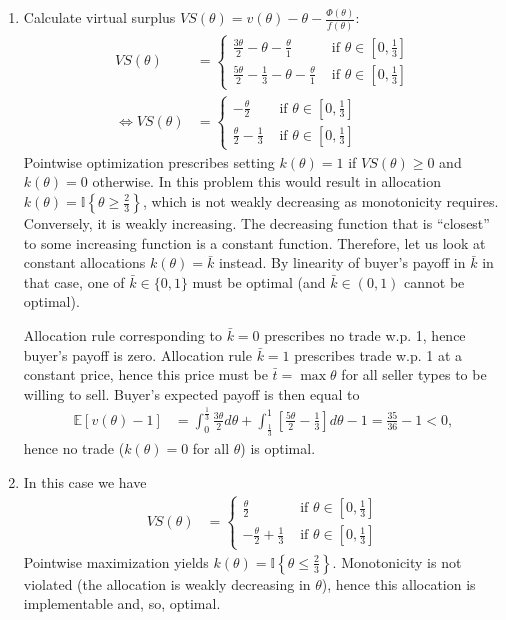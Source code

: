 \documentclass[a4paper]{article}
\begin{document}
\begin{enumerate}
	
	\item 
	Calculate virtual surplus $VS(\theta) = v(\theta) - \theta - \frac{\Phi(\theta)}{f(\theta)}$: 
	\begin{align*}
		VS(\theta) &= 
		\begin{cases}
			\frac{3\theta}{2} - \theta - \frac{\theta}{1} &\text{ if } \theta \in [0, \frac{1}{3}]
			\\
			\frac{5\theta}{2} - \frac{1}{3} - \theta - \frac{\theta}{1} &\text{ if } \theta \in [0, \frac{1}{3}]
		\end{cases}
		\\
		\Leftrightarrow
		VS(\theta) &= 
		\begin{cases}
			-\frac{\theta}{2} &\text{ if } \theta \in [0, \frac{1}{3}]
			\\
			\frac{\theta}{2} - \frac{1}{3} &\text{ if } \theta \in [0, \frac{1}{3}]
		\end{cases}
	\end{align*}
	Pointwise optimization prescribes setting $k(\theta) = 1$ if $VS(\theta) \geq 0$ and $k(\theta) = 0$ otherwise. In this problem this would result in allocation $k(\theta) = \mathbb{I} \left\{ \theta \geq \frac{2}{3} \right\}$, which is not weakly decreasing as monotonicity requires.
	Conversely, it is weakly increasing. The decreasing function that is ``closest'' to some increasing function is a constant function.
	Therefore, let us look at constant allocations $k(\theta) = \bar{k}$ instead. By linearity of buyer's payoff in $\bar{k}$ in that case, one of $\bar{k} \in \{0,1\}$ must be optimal (and $\bar{k} \in (0,1)$ cannot be optimal).
	
	Allocation rule corresponding to $\bar{k} = 0$ prescribes no trade w.p. 1, hence buyer's payoff is zero. Allocation rule $\bar{k} = 1$ prescribes trade w.p. 1 at a constant price, hence this price must be $\bar{t} = \max \theta$ for all seller types to be willing to sell. Buyer's expected payoff is then equal to
	\begin{align*}
		\mathbb{E} \left[ v(\theta) - 1 \right] &= \int_0^{\frac{1}{3}} \frac{3\theta}{2} d\theta + \int_{\frac{1}{3}}^{1} \left[ \frac{5 \theta}{2} - \frac{1}{3} \right] d\theta -1 = \frac{35}{36} - 1 < 0,
	\end{align*}
	hence no trade ($k(\theta) = 0$ for all $\theta$) is optimal.
	
	
	\item 	
	In this case we have
	\begin{align*}
		VS(\theta) &= 
		\begin{cases}
			\frac{\theta}{2} &\text{ if } \theta \in [0, \frac{1}{3}]
			\\
			-\frac{\theta}{2} + \frac{1}{3} &\text{ if } \theta \in [0, \frac{1}{3}]
		\end{cases}
	\end{align*}
	Pointwise maximization yields $k(\theta) = \mathbb{I} \left\{ \theta \leq \frac{2}{3} \right\}$. Monotonicity is not violated (the allocation is weakly decreasing in $\theta$), hence this allocation is implementable and, so, optimal.
\end{enumerate}
\fi
\end{document}
